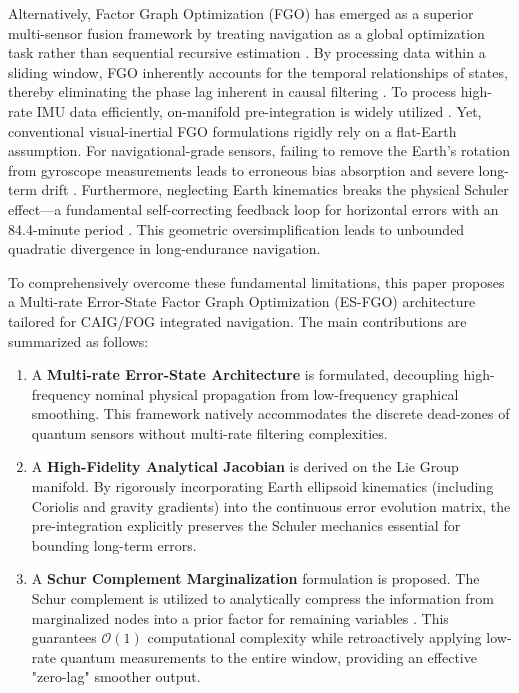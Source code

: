\documentclass[journal]{IEEEtran}
\begin{document}
	Alternatively, Factor Graph Optimization (FGO) has emerged as a superior multi-sensor fusion framework by treating navigation as a global optimization task rather than sequential recursive estimation \cite{b33, b60}. By processing data within a sliding window, FGO inherently accounts for the temporal relationships of states, thereby eliminating the phase lag inherent in causal filtering \cite{b48, b59}. To process high-rate IMU data efficiently, on-manifold pre-integration is widely utilized \cite{b56, b62}. Yet, conventional visual-inertial FGO formulations rigidly rely on a flat-Earth assumption. For navigational-grade sensors, failing to remove the Earth's rotation from gyroscope measurements leads to erroneous bias absorption and severe long-term drift \cite{b42, b57, b58, b63}. Furthermore, neglecting Earth kinematics breaks the physical Schuler effect—a fundamental self-correcting feedback loop for horizontal errors with an 84.4-minute period \cite{b27}. This geometric oversimplification leads to unbounded quadratic divergence in long-endurance navigation.
	
	To comprehensively overcome these fundamental limitations, this paper proposes a Multi-rate Error-State Factor Graph Optimization (ES-FGO) architecture tailored for CAIG/FOG integrated navigation. The main contributions are summarized as follows:
	\begin{enumerate}
		\item A \textbf{Multi-rate Error-State Architecture} is formulated, decoupling high-frequency nominal physical propagation from low-frequency graphical smoothing. This framework natively accommodates the discrete dead-zones of quantum sensors without multi-rate filtering complexities.
		\item A \textbf{High-Fidelity Analytical Jacobian} is derived on the Lie Group manifold. By rigorously incorporating Earth ellipsoid kinematics (including Coriolis and gravity gradients) into the continuous error evolution matrix, the pre-integration explicitly preserves the Schuler mechanics essential for bounding long-term errors.
		\item A \textbf{Schur Complement Marginalization} formulation is proposed. The Schur complement is utilized to analytically compress the information from marginalized nodes into a prior factor for remaining variables \cite{b46}. This guarantees $\mathcal{O}(1)$ computational complexity while retroactively applying low-rate quantum measurements to the entire window, providing an effective "zero-lag" smoother output.
	\end{enumerate}
	
\end{document}
